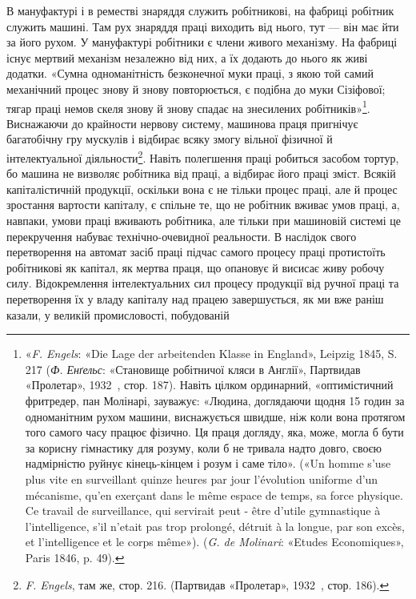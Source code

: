 В мануфактурі і в реместві знаряддя служить робітникові,
на фабриці робітник служить машині. Там рух знаряддя праці
виходить від нього, тут — він має йти за його рухом. У мануфактурі
робітники є члени живого механізму. На фабриці існує
мертвий механізм незалежно від них, а їх додають до нього як
живі додатки. «Сумна одноманітність безконечної муки праці, з
якою той самий механічний процес знову й знову повторюється, є
подібна до муки Сізіфової; тягар праці немов скеля знову й знову
спадає на знесилених робітників»\footnote{
«\emph{F. Engels}: «Die Lage der arbeitenden Klasse in England», Leipzig
1845, S. 217 (\emph{Ф. Енґельс}: «Становище робітничої кляси в Англії»,
Партвидав «Пролетар», 1932~, стор. 187). Навіть цілком ординарний,
«оптимістичний фритредер, пан Молінарі, зауважує: «Людина, доглядаючи
щодня 15 годин за одноманітним рухом машини, виснажується
швидше, ніж коли вона протягом того самого часу працює фізично. Ця праця
догляду, яка, може, могла б бути за корисну гімнастику для розуму,
коли б не тривала надто довго, своєю надмірністю руйнує кінець-кінцем
і розум і саме тіло». («Un homme s’use plus vite en surveillant quinze
heures par jour l’évolution uniforme d’un mécanisme, qu’en exerçant dans
le même espace de temps, sa force physique. Ce travail de surveillance,
qui servirait peut - être d’utile gymnastique à l’intelligence, s’il n’etait pas
trop prolongé, détruit à la longue, par son excès, et l’intelligence et le corps
même»). (\emph{G. de Molinari}: «Etudes Economiques», Paris 1846, p. 49).
}. Виснажаючи до крайности
нервову систему, машинова праця пригнічує багатобічну гру
мускулів і відбирає всяку змогу вільної фізичної й інтелектуальної
діяльности\footnote{
\emph{F. Engels}, там же, стор. 216. (Партвидав «Пролетар», 1932~,
стор. 186).
}. Навіть полегшення праці робиться засобом тортур,
бо машина не визволяє робітника від праці, а відбирає його
праці зміст. Всякій капіталістичній продукції, оскільки вона є
не тільки процес праці, але й процес зростання вартости капіталу,
є спільне те, що не робітник вживає умов праці, а, навпаки,
умови праці вживають робітника, але тільки при машиновій
системі це перекручення набуває технічно-очевидної реальности.
В наслідок свого перетворення на автомат засіб праці підчас
самого процесу праці протистоїть робітникові як капітал,
як мертва праця, що опановує й висисає живу робочу силу. Відокремлення
інтелектуальних сил процесу продукції від ручної
праці та перетворення їх у владу капіталу над працею завершується,
як ми вже раніш казали, у великій промисловості, побудованій
